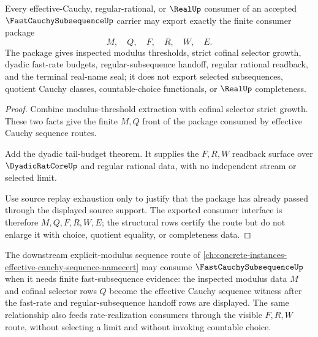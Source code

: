 \begin{theorem}
\label{thm:fast-cauchy-subsequence-effective-consumer-export}
Every effective-Cauchy, regular-rational, or $\RealUp$ consumer of an accepted $\FastCauchySubsequenceUp$ carrier may export exactly the finite consumer package
$$
M,\quad Q,\quad F,\quad R,\quad W,\quad E.
$$
The package gives inspected modulus thresholds, strict cofinal selector growth, dyadic fast-rate budgets, regular-subsequence handoff, regular rational readback, and the terminal real-name seal; it does not export selected subsequences, quotient Cauchy classes, countable-choice functionals, or $\RealUp$ completeness.
\end{theorem}
\begin{proof}
Combine modulus-threshold extraction with cofinal selector strict growth. These two facts give the finite $M,Q$ front of the package consumed by effective Cauchy sequence routes.

Add the dyadic tail-budget theorem. It supplies the $F,R,W$ readback surface over $\DyadicRatCoreUp$ and regular rational data, with no independent stream or selected limit.

Use source replay exhaustion only to justify that the package has already passed through the displayed source support. The exported consumer interface is therefore $M,Q,F,R,W,E$; the structural rows certify the route but do not enlarge it with choice, quotient equality, or completeness data.
\end{proof}

The downstream explicit-modulus sequence route of \autoref{ch:concrete-instances-effective-cauchy-sequence-namecert} may consume $\FastCauchySubsequenceUp$ when it needs finite fast-subsequence evidence: the inspected modulus data $M$ and cofinal selector rows $Q$ become the effective Cauchy sequence witness after the fast-rate and regular-subsequence handoff rows are displayed. The same relationship also feeds rate-realization consumers through the visible $F,R,W$ route, without selecting a limit and without invoking countable choice.


